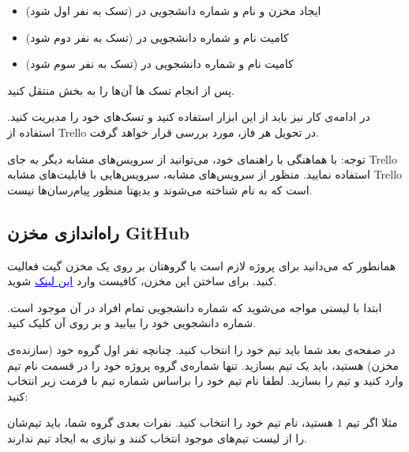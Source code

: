 \documentclass[]{article}
\begin{document}
\begin{itemize}

\item
ایجاد مخزن  و  نام و شماره دانشجویی در  (تسک به نفر اول  شود)

\item
کامیت نام و شماره دانشجویی در  (تسک به نفر دوم  شود)

\item
کامیت نام و شماره دانشجویی در  (تسک به نفر سوم  شود)

\end{itemize}

پس از انجام تسک ها آن‌ها را به بخش  منتقل کنید.

در ادامه‌ی کار نیز باید از این ابزار استفاده کنید ‌و تسک‌های خود را مدیریت کنید. استفاده از Trello در تحویل هر فاز، مورد بررسی قرار خواهد گرفت.

توجه: با هماهنگی با راهنمای خود، می‌توانید از سرویس‌های مشابه دیگر به جای Trello استفاده نمایید. منظور از سرویس‌های مشابه، سرویس‌هایی با قابلیت‌های مشابه Trello است که به ‌نام  شناخته می‌شوند و بدیهتا منظور پیام‌رسان‌ها نیست.


\newpage
\subsection*{{\titr راه‌اندازی مخزن GitHub}}
\label{subsec:github}

همانطور که می‌دانید برای پروژه لازم است با گروهتان بر روی یک مخزن  گیت فعالیت کنید. برای ساختن این مخزن، کافیست وارد
 \href{https://classroom.github.com/g/tL0HyMWO}{\textcolor{blue}{\underline{این لینک}}} 
 شوید.

ابتدا با لیستی مواجه می‌شوید که شماره دانشجویی تمام افراد در آن موجود است. شماره دانشجویی خود را بیابید و بر روی آن کلیک کنید.

در صفحه‌ی بعد شما باید تیم خود را انتخاب کنید. چنانچه نفر اول گروه خود (سازنده‌ی مخزن) هستید، باید یک تیم بسازید. تنها شماره‌ی گروه پروژه خود را در قسمت نام تیم وارد کنید و تیم را بسازید. لطفا نام تیم خود را براساس شماره تیم با فرمت زیر انتخاب کنید:
\begin{flushleft}
\end{flushleft}


مثلا اگر تیم $1$ هستید، نام تیم خود را  انتخاب کنید. نفرات بعدی گروه شما، باید تیم‌شان را از لیست تیم‌های موجود انتخاب کنند و نیازی به ایجاد تیم ندارند.
\end{document}
